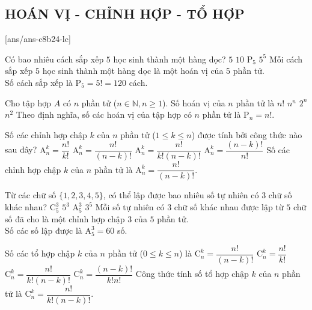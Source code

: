 \subsection{HOÁN VỊ - CHỈNH HỢP - TỔ HỢP}
 
\setcounter{ex}{0}
[ans/ans-c8b24-lc]
\begin{ex}%
	Có bao nhiêu cách sắp xếp $5$ học sinh thành một hàng dọc?
	\choice
	{$5$}
	{$10$}
	{\True $\mathrm{P}_5$}
	{$5^5$}
	\loigiai
	{
		Mỗi cách sắp xếp $5$ học sinh thành một hàng dọc là một hoán vị của $5$ phần tử.\\
		Số cách sắp xếp là $\mathrm{P}_5 = 5! = 120$ cách.
	}
\end{ex}
\begin{ex}%
	Cho tập hợp $A$ có $n$ phần tử ($n \in \mathbb{N}, n \ge 1$). Số hoán vị của $n$ phần tử là
	\choice
	{\True $n!$}
	{$n^n$}
	{$2^n$}
	{$n^2$}
	\loigiai
	{
		Theo định nghĩa, số các hoán vị của tập hợp có $n$ phần tử là $\mathrm{P}_n = n!$.
	}
\end{ex}
\begin{ex}%
	Số các chỉnh hợp chập $k$ của $n$ phần tử ($1 \le k \le n$) được tính bởi công thức nào sau đây?
	\choice
	{$\mathrm{A}_n^k = \dfrac{n!}{k!}$}
	{\True $\mathrm{A}_n^k = \dfrac{n!}{(n-k)!}$}
	{$\mathrm{A}_n^k = \dfrac{n!}{k!(n-k)!}$}
	{$\mathrm{A}_n^k = \dfrac{(n-k)!}{n!}$}
	\loigiai
	{
		Số các chỉnh hợp chập $k$ của $n$ phần tử là $\mathrm{A}_n^k = \dfrac{n!}{(n-k)!}$.
	}
\end{ex}
\begin{ex}%
	Từ các chữ số $\{1, 2, 3, 4, 5\}$, có thể lập được bao nhiêu số tự nhiên có $3$ chữ số khác nhau?
	\choice
	{$\mathrm{C}_5^3$}
	{$5^3$}
	{\True $\mathrm{A}_5^3$}
	{$3^5$}
	\loigiai
	{
		Mỗi số tự nhiên có $3$ chữ số khác nhau được lập từ $5$ chữ số đã cho là một chỉnh hợp chập $3$ của $5$ phần tử.\\
		Số các số lập được là $\mathrm{A}_5^3 = 60$ số.
	}
\end{ex}
\begin{ex}%
	Số các tổ hợp chập $k$ của $n$ phần tử ($0 \le k \le n$) là
	\choice
	{$\mathrm{C}_n^k = \dfrac{n!}{(n-k)!}$}
	{$\mathrm{C}_n^k = \dfrac{n!}{k!}$}
	{\True $\mathrm{C}_n^k = \dfrac{n!}{k!(n-k)!}$}
	{$\mathrm{C}_n^k = \dfrac{(n-k)!}{k!n!}$}
	\loigiai
	{
		Công thức tính số tổ hợp chập $k$ của $n$ phần tử là $\mathrm{C}_n^k = \dfrac{n!}{k!(n-k)!}$.
	}
\end{ex}
